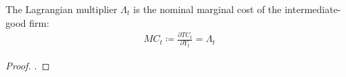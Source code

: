 \documentclass[../thesis.tex]{subfiles}
\begin{document}
\begin{lemma}\label{lemma:marginal-cost}
	The Lagrangian multiplier $\Lambda_t$ is the nominal marginal cost of the intermediate-good firm:
	\begin{align}
		MC_t \coloneq \frac{\partial TC_t}{\partial Y_t} = \Lambda_t
	\end{align}
	
	\begin{proof}
		\textcite[p.449]{simon_mathematics_1994}.
	\end{proof}
	
\end{lemma}

\begin{comment}



\begin{definition}[Constant Returns to Scale]
	\cite[Lecture 1, p.5]{solis-garcia_ucb_2022}
\end{definition}

\begin{definition}[Homogeneous Function of Degree $k$]
	\cite[Lecture 1, p.5]{solis-garcia_ucb_2022}
\end{definition}

\subsubsection*{Monetary Authority}

\subsubsection*{Shocks}

\subsubsection*{Equilibrium Conditions}

\begin{definition}[Competitive Equilibrium]
	\cite[Lecture 1, p.6]{solis-garcia_ucb_2022}
\end{definition}


\subsubsection*{Steady State}


\end{comment}
\end{document}

